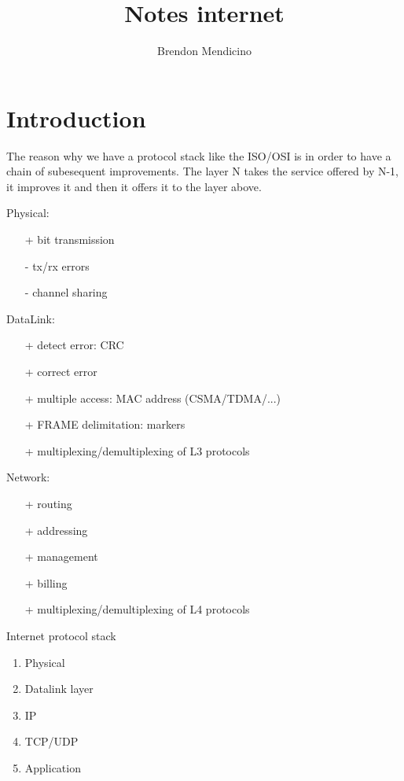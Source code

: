 \documentclass[12pt]{article}
\title{Notes internet}
\author{Brendon Mendicino}
\begin{document}
\maketitle
\newpage
\tableofcontents
\newpage

\section{Introduction}
The reason why we have a protocol stack like the ISO/OSI is in order to have a chain of subesequent improvements. The layer N takes the service offered by N-1, it improves it and then it offers it to the layer above.

Physical:
\begin{itemize}
  \item[+] bit transmission
  \item[-] tx/rx errors
  \item[-] channel sharing
\end{itemize}
DataLink:
\begin{itemize}
  \item[+] detect error: CRC
  \item[+] correct error
  \item[+] multiple access: MAC address (CSMA/TDMA/...)
  \item[+] FRAME delimitation: markers
  \item[+] multiplexing/demultiplexing of L3 protocols
\end{itemize}
Network:
\begin{itemize}
  \item[+] routing
  \item[+] addressing
  \item[+] management
  \item[+] billing
  \item[+] multiplexing/demultiplexing of L4 protocols
\end{itemize}
Internet protocol stack
\begin{enumerate}
  \item Physical
  \item Datalink layer
  \item IP
  \item TCP/UDP
  \item Application
\end{enumerate}
\end{document}
